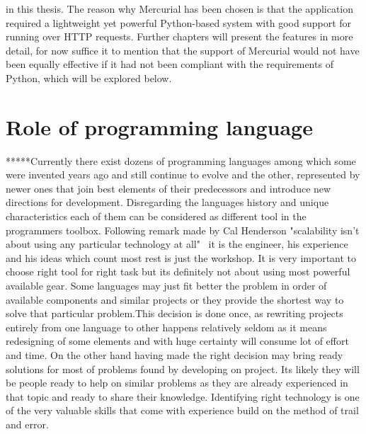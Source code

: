 in this thesis. The reason why Mercurial has been chosen is that the application required a lightweight yet powerful Python-based system with good support for running over HTTP requests. Further chapters will present the features in more detail, for now suffice it to mention that the support of Mercurial would not have been equally effective if it had not been compliant with the requirements of Python, which will be explored below.

\section{Role of programming language}\label{sec:languages}
*****Currently there exist dozens of programming languages among which some were invented years ago and still continue to evolve and the other, represented by newer ones that join best elements of their predecessors and introduce new directions for development. Disregarding the languages history and unique characteristics each of them can be considered as different tool in the programmers toolbox. Following remark made by Cal Henderson "scalability isn't about using any particular technology at all"~\cite[page 203]{build_scalable} it is the engineer, his experience and his ideas which count most rest is just the workshop. It is very important to choose right tool for right task but its definitely not about using most powerful available gear. Some languages may just fit better the problem in order of available components and similar projects or they provide the shortest way to solve that particular problem.This decision is done once, as rewriting projects entirely from one language to other happens relatively seldom as it means redesigning of some elements and with huge certainty will consume lot of effort and time. On the other hand having made the right decision may bring ready solutions for most of problems found by developing on project. Its likely they will be people ready to help on similar problems as they are already experienced in that topic and ready to share their knowledge. Identifying right technology is one of the very valuable skills that come with experience build on the method of trail and error. 
  
